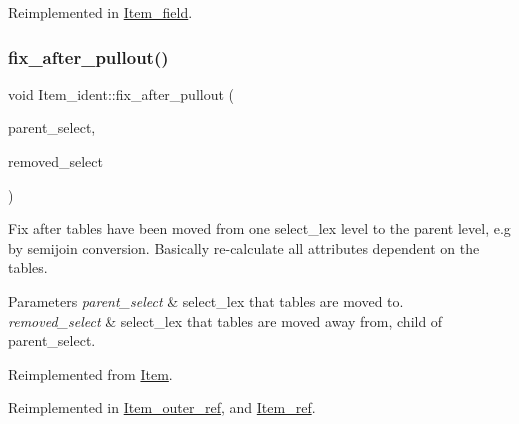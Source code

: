 Reimplemented in \mbox{\hyperlink{classItem__field_aff70313ac49d91b6b51e522b8ac4cb30}{Item\+\_\+field}}.

\mbox{\label{classItem__ident_aef2c77c01832da121180c1a74d3873b5}} 
\subsubsection{\texorpdfstring{fix\+\_\+after\+\_\+pullout()}{fix\_after\_pullout()}}
{\footnotesize\ttfamily void Item\+\_\+ident\+::fix\+\_\+after\+\_\+pullout (\begin{DoxyParamCaption}\item[{st\+\_\+select\+\_\+lex $\ast$}]{parent\+\_\+select,  }\item[{st\+\_\+select\+\_\+lex $\ast$}]{removed\+\_\+select }\end{DoxyParamCaption})\hspace{0.3cm}{\ttfamily [virtual]}}

Fix after tables have been moved from one select\+\_\+lex level to the parent level, e.\+g by semijoin conversion. Basically re-\/calculate all attributes dependent on the tables.


\begin{DoxyParams}{Parameters}
{\em parent\+\_\+select} & select\+\_\+lex that tables are moved to. \\
\hline
{\em removed\+\_\+select} & select\+\_\+lex that tables are moved away from, child of parent\+\_\+select. \\
\hline
\end{DoxyParams}


Reimplemented from \mbox{\hyperlink{classItem_a6e3c38497d210357a4f80a755fb7b61e}{Item}}.



Reimplemented in \mbox{\hyperlink{classItem__outer__ref_a30ff5c4083f8d4d7c6ab5c7b2b4fac0c}{Item\+\_\+outer\+\_\+ref}}, and \mbox{\hyperlink{classItem__ref_a54fdde8c2418171d5f529e24d733f357}{Item\+\_\+ref}}.

\mbox{\label{classItem__ident_a194dc68fa277272d155ac9cb893384b8}} 
